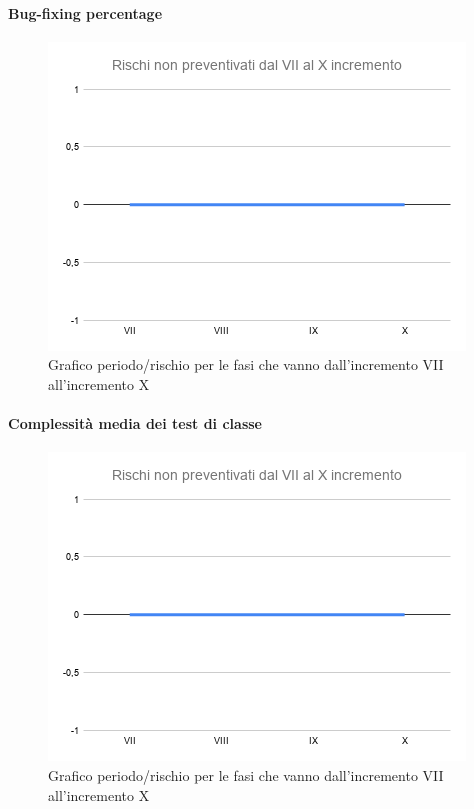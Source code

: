 \paragraph{Bug-fixing percentage}
\begin{figure}[H]
			\centering%
			\includegraphics[width=0.8\linewidth]{./res/images/RischiNonPreven_4.png}
			\caption{Grafico periodo/rischio per le fasi che vanno dall'incremento VII all'incremento X}
			\label{fig:Grafico periodo/rischio per le fasi che vanno dall'incremento VII all'incremento X}
	\end{figure}
\paragraph{Complessità media dei test di classe}
\begin{figure}[H]
			\centering%
			\includegraphics[width=0.8\linewidth]{./res/images/RischiNonPreven_4.png}
			\caption{Grafico periodo/rischio per le fasi che vanno dall'incremento VII all'incremento X}
			\label{fig:Grafico periodo/rischio per le fasi che vanno dall'incremento VII all'incremento X}
	\end{figure}


